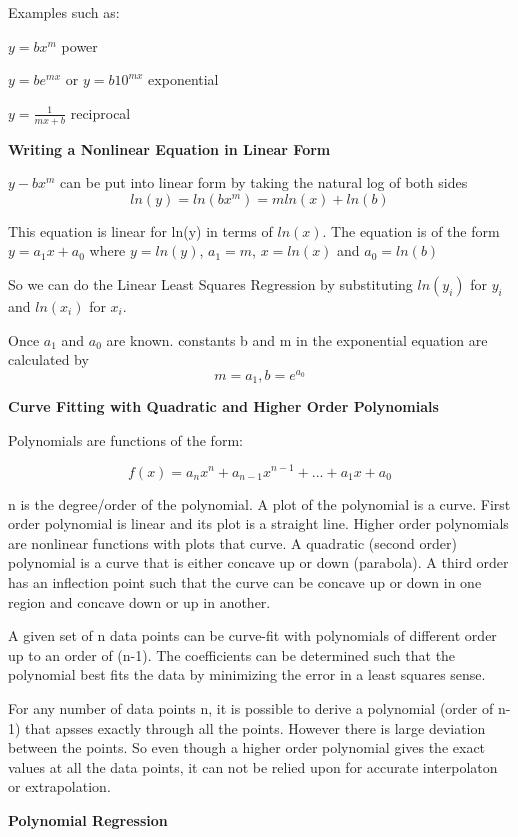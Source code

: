 \documentclass{article}
\begin{document}
Examples such as:


$y = bx^m$ 							power

$y = be^{mx}$ or $y = b10^{mx}$			exponential

$y = \frac{1}{mx + b}$ 					reciprocal


\textbf{Writing a Nonlinear Equation in Linear Form}

$y - bx^m$ can be put into linear form by taking the natural log of both sides
\[ln(y) = ln(bx^m) = mln(x) + ln(b)\]

This equation is linear for ln(y) in terms of $ln(x)$. The equation is of the form $ y = a_1x + a_0$ where $y = ln(y)$, $a_1 = m$, $x = ln(x)$ and $a_0 = ln(b)$

So we can do the Linear Least Squares Regression by substituting $ln(y_i)$ for $y_i$ and $ln(x_i)$ for $x_i$.

Once $a_1$ and $a_0$ are known. constants b and m in the exponential equation are calculated by \[m = a_1, b = e^{a_0}\]



\textbf{Curve Fitting with Quadratic and Higher Order Polynomials}

Polynomials are functions of the form:

\[f(x) = a_nx^n + a_{n-1}x^{n-1} + ... + a_1x + a_0\]

n is the degree/order of the polynomial. A plot of the polynomial is a curve. First order polynomial is linear and its plot is a straight line. Higher order polynomials are nonlinear functions with plots that curve. A quadratic (second order) polynomial is a curve that is either concave up or down (parabola). A third order has an inflection point such that the curve can be concave up or down in one region and concave down or up in another.

A given set of n data points can be curve-fit with polynomials of different order up to an order of (n-1). The coefficients can be determined such that the polynomial best fits the data by minimizing the error in a least squares sense.

For any number of data points n, it is possible to derive a polynomial (order of n-1) that apsses exactly through all the points. However there is large deviation between the points. So even though a higher order polynomial gives the exact values at all the data points, it can not be relied upon for accurate interpolaton or extrapolation.



\textbf{Polynomial Regression}
\end{document}
